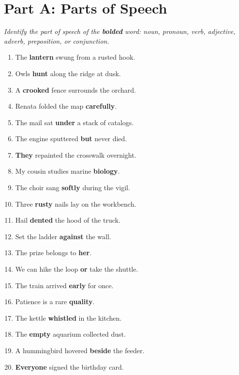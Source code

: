 \documentclass[11pt]{article}
\newcommand{\ansline}{\underline{\hspace{1.1in}}}
\begin{document}
\section*{Part A: Parts of Speech}
\noindent\textit{Identify the part of speech of the \textbf{bolded} word: noun, pronoun, verb, adjective, adverb, preposition, or conjunction.}
\begin{enumerate}
  \item The \textbf{lantern} swung from a rusted hook. \ansline
  \item Owls \textbf{hunt} along the ridge at dusk. \ansline
  \item A \textbf{crooked} fence surrounds the orchard. \ansline
  \item Renata folded the map \textbf{carefully}. \ansline
  \item The mail sat \textbf{under} a stack of catalogs. \ansline
  \item The engine sputtered \textbf{but} never died. \ansline
  \item \textbf{They} repainted the crosswalk overnight. \ansline
  \item My cousin studies marine \textbf{biology}. \ansline
  \item The choir sang \textbf{softly} during the vigil. \ansline
  \item Three \textbf{rusty} nails lay on the workbench. \ansline
  \item Hail \textbf{dented} the hood of the truck. \ansline
  \item Set the ladder \textbf{against} the wall. \ansline
  \item The prize belongs to \textbf{her}. \ansline
  \item We can hike the loop \textbf{or} take the shuttle. \ansline
  \item The train arrived \textbf{early} for once. \ansline
  \item Patience is a rare \textbf{quality}. \ansline
  \item The kettle \textbf{whistled} in the kitchen. \ansline
  \item The \textbf{empty} aquarium collected dust. \ansline
  \item A hummingbird hovered \textbf{beside} the feeder. \ansline
  \item \textbf{Everyone} signed the birthday card. \ansline
\end{enumerate}
\end{document}
